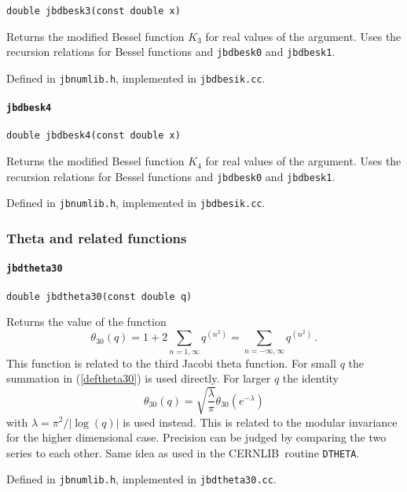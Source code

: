 \documentclass[12pt,a4paper]{article}
\newcommand{\mytt}[1]{\texttt{#1}}
\newcommand{\newfunction}[1]{\mytt{#1}\index{\mytt{#1}}}
\newcommand{\cernlib}{\textsc{CERNLIB}\cite{cernlib}}
\begin{document}
\mytt{double jbdbesk3(const double x)}

Returns the modified Bessel function $K_3$ for real values of the argument.
Uses the recursion relations for Bessel functions
and \mytt{jbdbesk0} and \mytt{jbdbesk1}.

Defined in \mytt{jbnumlib.h}, implemented in \mytt{jbdbesik.cc}.

\paragraph{\newfunction{jbdbesk4}}

\mytt{double jbdbesk4(const double x)}

Returns the modified Bessel function $K_4$ for real values of the argument.
Uses the recursion relations for Bessel functions
and \mytt{jbdbesk0} and \mytt{jbdbesk1}.

Defined in \mytt{jbnumlib.h}, implemented in \mytt{jbdbesik.cc}.


\subsubsection{Theta and related functions}

\paragraph{\newfunction{jbdtheta30}}

\mytt{double jbdtheta30(const double q)}

Returns the value of the function
\begin{equation}
\label{deftheta30}
\theta_{30}(q) = 1+2\sum_{n=1,\infty} q^{(n^2)}
= \sum_{n=-\infty,\infty} q^{(n^2)}\,.
\end{equation}
This function is related to the third Jacobi theta function.
For small $q$ the summation in (\ref{deftheta30}) is used directly.
For larger $q$ the identity
\begin{equation}
\label{theta30relation}
\theta_{30}(q) = \sqrt{\frac{\lambda}{\pi}}\theta_{30}\left(e^{-\lambda}\right)
\end{equation}
with $\lambda = \pi^2/|\log(q)|$ is used instead.
This is related to the modular invariance for the higher dimensional case.
Precision can be judged by comparing the two series to each other.
Same idea as used in the \cernlib\ routine \mytt{DTHETA}.

Defined in \mytt{jbnumlib.h}, implemented in \mytt{jbdtheta30.cc}.
\end{document}
